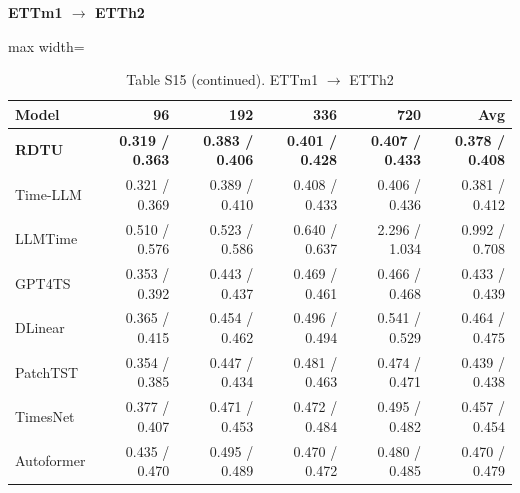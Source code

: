 \begin{table}[H]\centering\small
\caption*{Table S15 (continued). ETTm1 $\to$ ETTh2}
\textbf{ETTm1 $\to$ ETTh2}\par\smallskip
\begin{adjustbox}{max width=\linewidth}\begin{tabular}{lrrrrr}\toprule
\textbf{Model} & \textbf{96} & \textbf{192} & \textbf{336} & \textbf{720} & \textbf{Avg}\\\midrule
\rowcolor{blue!5}
\textbf{RDTU} & \textbf{0.319 / 0.363} & \textbf{0.383 / 0.406} & \textbf{0.401 / 0.428} & \textbf{0.407 / 0.433} & \textbf{0.378 / 0.408}\\
Time-LLM & 0.321 / 0.369 & 0.389 / 0.410 & 0.408 / 0.433 & 0.406 / 0.436 & 0.381 / 0.412\\
LLMTime & 0.510 / 0.576 & 0.523 / 0.586 & 0.640 / 0.637 & 2.296 / 1.034 & 0.992 / 0.708\\
GPT4TS & 0.353 / 0.392 & 0.443 / 0.437 & 0.469 / 0.461 & 0.466 / 0.468 & 0.433 / 0.439\\
DLinear & 0.365 / 0.415 & 0.454 / 0.462 & 0.496 / 0.494 & 0.541 / 0.529 & 0.464 / 0.475\\
PatchTST & 0.354 / 0.385 & 0.447 / 0.434 & 0.481 / 0.463 & 0.474 / 0.471 & 0.439 / 0.438\\
TimesNet & 0.377 / 0.407 & 0.471 / 0.453 & 0.472 / 0.484 & 0.495 / 0.482 & 0.457 / 0.454\\
Autoformer & 0.435 / 0.470 & 0.495 / 0.489 & 0.470 / 0.472 & 0.480 / 0.485 & 0.470 / 0.479\\
\bottomrule\end{tabular}\end{adjustbox}\end{table}
